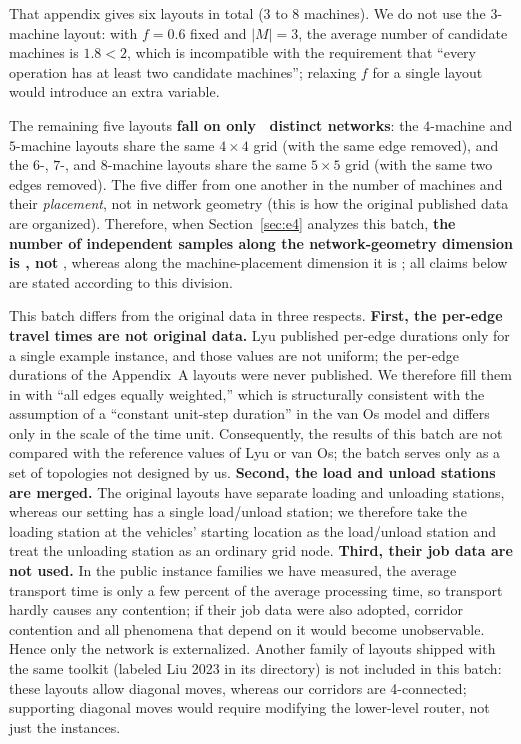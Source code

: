 That appendix gives six layouts in total (\(3\) to \(8\) machines). We do not use the \(3\)-machine layout: with \(f=0.6\) fixed and \(|M|=3\),
the average number of candidate machines is \(1.8<2\), which is incompatible with the requirement that ``every operation has at least two candidate machines''; relaxing \(f\) for a single layout
would introduce an extra variable.

The remaining five layouts \textbf{fall on only \NPubNets\ distinct networks}: the \(4\)-machine and \(5\)-machine layouts share
the same \(4\times 4\) grid (with the same edge removed), and the \(6\)-, \(7\)-, and \(8\)-machine layouts share the same
\(5\times 5\) grid (with the same two edges removed). The five differ from one another in the number of machines and their \emph{placement},
not in network geometry (this is how the original published data are organized). Therefore, when Section~\ref{sec:e4} analyzes this batch,
\textbf{the number of independent samples along the network-geometry dimension is \NPubNets, not \NPubInst}, whereas along the machine-placement dimension
it is \NPubInst; all claims below are stated according to this division.

This batch differs from the original data in three respects. \textbf{First, the per-edge travel times are not original data.} Lyu published per-edge durations only for a single example
instance, and those values are not uniform; the per-edge durations of the Appendix~A layouts were never published. We therefore fill them in
with ``all edges equally weighted,'' which is structurally consistent with the assumption of a ``constant unit-step duration'' in the van Os model and differs only in the scale of
the time unit. Consequently, the results of this batch are not compared with the reference values of Lyu or van Os; the batch serves only as a set of topologies not designed by us. \textbf{Second, the load and unload stations are merged.} The original layouts have separate
loading and unloading stations, whereas our setting has a single load/unload station; we therefore take the loading station at the vehicles' starting location as the load/unload station and treat the unloading station as an ordinary
grid node. \textbf{Third, their job data are not used.} In the public instance families we have measured, the average transport time is only a few percent of the average
processing time, so transport hardly causes any contention; if their job data were also adopted, corridor contention and all
phenomena that depend on it would become unobservable. Hence only the network is externalized.
Another family of layouts shipped with the same toolkit (labeled Liu 2023 in its directory) is not included in this batch: these layouts allow diagonal
moves, whereas our corridors are 4-connected; supporting diagonal moves would require modifying the lower-level router, not just the instances.

